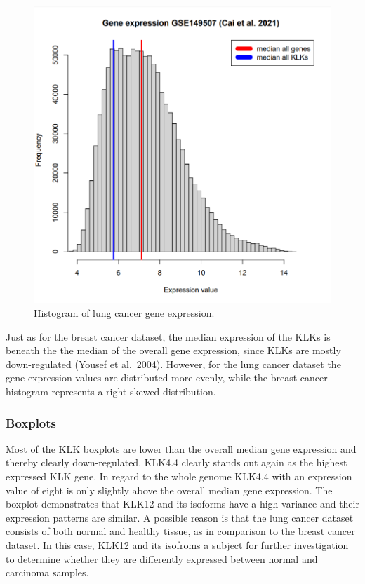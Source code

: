 \documentclass[
]{article}
\begin{document}
\begin{figure}

{\centering \includegraphics[width=0.5\linewidth]{images/Histogram_lung} 

}

\caption{Histogram of lung cancer gene expression.}\label{fig:Histogram - lung }
\end{figure}

Just as for the breast cancer dataset, the median expression of the KLKs
is beneath the the median of the overall gene expression, since KLKs are
mostly down-regulated (Yousef et al.~2004). However, for the lung cancer
dataset the gene expression values are distributed more evenly, while
the breast cancer histogram represents a right-skewed distribution.

\hypertarget{boxplots-1}{%
\subsubsection{Boxplots}\label{boxplots-1}}

Most of the KLK boxplots are lower than the overall median gene
expression and thereby clearly down-regulated. KLK4.4 clearly stands out
again as the highest expressed KLK gene. In regard to the whole genome
KLK4.4 with an expression value of eight is only slightly above the
overall median gene expression. The boxplot demonstrates that KLK12 and
its isoforms have a high variance and their expression patterns are
similar. A possible reason is that the lung cancer dataset consists of
both normal and healthy tissue, as in comparison to the breast cancer
dataset. In this case, KLK12 and its isofroms a subject for further
investigation to determine whether they are differently expressed
between normal and carcinoma samples.
\end{document}

